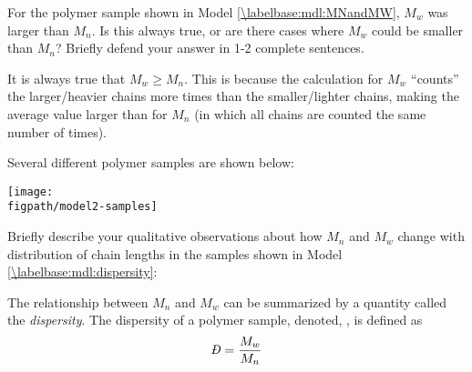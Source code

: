\begin{activity}
\begin{ctqs}
	\question For the polymer sample shown in Model \ref{\labelbase:mdl:MNandMW}, $M_w$ was larger than $M_n$.  Is this always true, or are there cases where $M_w$ could be smaller than $M_n$?  Briefly defend your answer in 1-2 complete sentences.
	
		\label{\labelbase:ctq:MWvsMN}
		
		\begin{solution}[2in]
		
			It is always true that $M_w \geq M_n$.  This is because the calculation for $M_w$ ``counts'' the larger/heavier chains more times than the smaller/lighter chains, making the average value larger than for $M_n$ (in which all chains are counted the same number of times).
			
		\end{solution}
	
		
\end{ctqs}

\begin{model}
\label{\labelbase:mdl:dispersity}

	Several different polymer samples are shown below:
	
	\vspace{6pt}
	\centerline{\texttt{[image: \\figpath/model2-samples]}}

\end{model}
	
\begin{ctqs}

	\question Briefly describe your qualitative observations about how $M_n$ and $M_w$ change with distribution of chain lengths in the samples shown in Model \ref{\labelbase:mdl:dispersity}:
	
		\begin{solution}[2in]
		\end{solution}
	
\end{ctqs}

\begin{infobox}

	The relationship between $M_n$ and $M_w$ can be summarized by a quantity called the \emph{dispersity}.  The dispersity of a polymer sample, denoted, \PDItext, is defined as
	\begin{equation*}
		\PDImath = \frac{M_w}{M_n}
	\end{equation*}
	

\end{infobox}
\end{activity}
